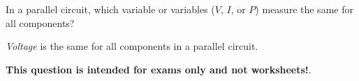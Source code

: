 

In a parallel circuit, which variable or variables ($V$, $I$, or $P$) measure the same for all components?







{\it Voltage} is the same for all components in a parallel circuit.







{\bf This question is intended for exams only and not worksheets!}.



